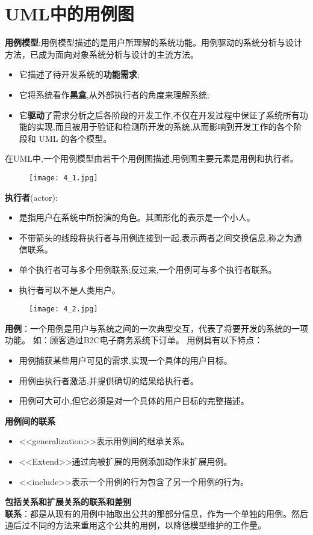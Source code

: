 \documentclass[../main.tex]{subfiles}
\begin{document}
\section{UML中的用例图}
\textbf{用例模型}:用例模型描述的是用户所理解的系统功能。用例驱动的系统分析与设计方法，已成为面向对象系统分析与设计的主流方法。
\begin{itemize}
  \item 它描述了待开发系统的\textbf{功能需求};
  \item 它将系统看作\textbf{黑盒},从外部执行者的角度来理解系统;
  \item 它\textbf{驱动}了需求分析之后各阶段的开发工作,不仅在开发过程中保证了系统所有功能的实现,而且被用于验证和检测所开发的系统,从而影响到开发工作的各个阶段和 UML 的各个模型。
\end{itemize}
在UML中,一个用例模型由若干个用例图描述,用例图主要元素是用例和执行者。
\begin{figure}[H]
  \begin{center}
    \texttt{[image: 4\_1.jpg]}
  \end{center}
\end{figure}
\textbf{执行者}(actor):
\begin{itemize}
  \item 是指用户在系统中所扮演的角色。其图形化的表示是一个小人。
  \item 不带箭头的线段将执行者与用例连接到一起,表示两者之间交换信息,称之为通信联系。
  \item 单个执行者可与多个用例联系;反过来,一个用例可与多个执行者联系。
  \item 执行者可以不是人类用户。
\end{itemize}
\begin{figure}[H]
  \begin{center}
    \texttt{[image: 4\_2.jpg]}
  \end{center}
\end{figure}
\textbf{用例}：一个用例是用户与系统之间的一次典型交互，代表了将要开发的系统的一项功能。
如：顾客通过B2C电子商务系统下订单。
用例具有以下特点：
\begin{itemize}
  \item 用例捕获某些用户可见的需求,实现一个具体的用户目标。
  \item 用例由执行者激活,并提供确切的结果给执行者。
  \item 用例可大可小,但它必须是对一个具体的用户目标的完整描述。
\end{itemize}
\textbf{用例间的联系}
\begin{itemize}
  \item <<generalization>>表示用例间的继承关系。
  \item <<Extend>>通过向被扩展的用例添加动作来扩展用例。
  \item <<include>>表示一个用例的行为包含了另一个用例的行为。
\end{itemize}
\textbf{包括关系和扩展关系的联系和差别}\\
\textbf{联系}：都是从现有的用例中抽取出公共的那部分信息，作为一个单独的用例。然后通后过不同的方法来重用这个公共的用例，以降低模型维护的工作量。
\end{document}
